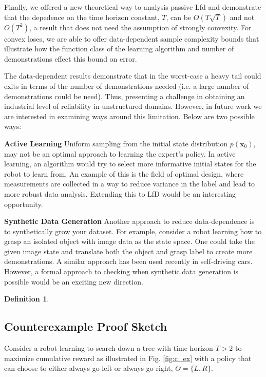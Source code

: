 \documentclass[10pt, conference]{ieeeconf}      %
\newcommand{\bx}{\mathbf{x}}
\newtheorem{defn}{Definition}[section]
\begin{document}
Finally, we offered a new theoretical  way to analysis passive Lfd and demonstrate that the depedence on the time horizon constant, $T$, can be $O(T\sqrt{T})$ and not $O(T^2)$, a result that does not need the assumption of strongly convexity.  For convex loses, we are able to offer data-dependent sample complexity bounds that illustrate how the function class of the learning algorithm and number of demonstrations effect this bound on error. 

The data-dependent results demonstrate that in the worst-case a heavy tail could exits in terms of the number of demonstrations needed (i.e. a large number of demonstrations could be need). Thus, presenting a challenge in obtaining an industrial level of reliability in unstructured domains. However, in future work we are interested in examining ways around this limitation. Below are two possible ways:

\noindent \textbf{Active Learning} Uniform sampling from the initial state distribution $p(\bx_0)$, may not be an optimal approach to learning the expert's policy. In active learning, an algorithm would try to select more informative initial states for the robot to learn from. An example of this is the field of optimal design, where measurements are collected in a way to reduce variance in the label and lead to more robust data analysis. Extending this to LfD would be an interesting opportunity. 

\noindent \textbf{Synthetic Data Generation} Another approach to reduce data-dependence is to synthetically grow your dataset. For example, consider a robot learning how to grasp an isolated object  with image data as the state space. One could take the given image state and translate both the object and grasp label to create more demonstrations. A similar approach has been used recently in self-driving cars. However, a formal approach to checking when synthetic data generation is possible would be an exciting new direction. 




\appendix


\begin{defn}

\end{defn}

\subsection{Counterexample Proof Sketch}
Consider a robot learning to search down a tree with time horizon $T > 2$ to maximize cumulative reward as illustrated in Fig. \ref{fig:c_ex} with a policy that can choose to either always go left or always go right, $\Theta = \lbrace L,R \rbrace$.
\end{document}
